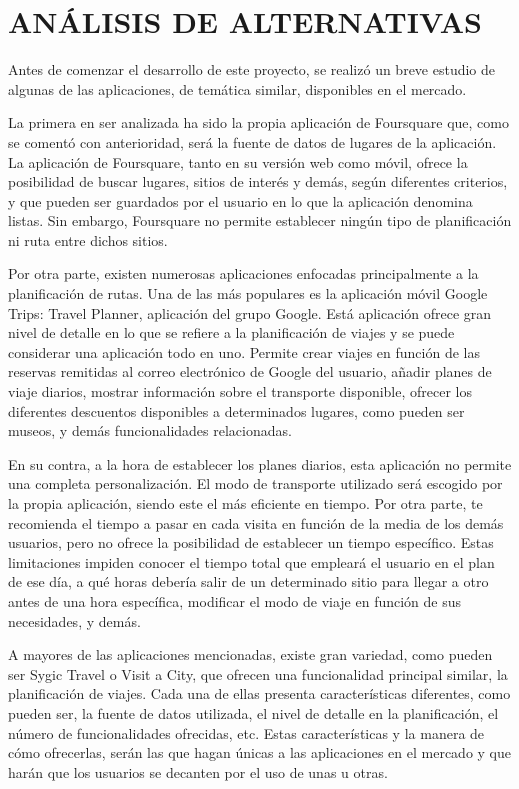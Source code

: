 \chapter[Análisis de alternativas]{
  \label{chp:analisisdealternativas}
  ANÁLISIS DE ALTERNATIVAS
}
\thispagestyle{numberingStyle}
\pagestyle{numberingStyle}



Antes de comenzar el desarrollo de este proyecto, se realizó un breve estudio de algunas de las aplicaciones, de temática similar, disponibles en el mercado. 

La primera en ser analizada ha sido la propia aplicación de Foursquare que, como se comentó con anterioridad, será la fuente de datos de lugares de la aplicación. La aplicación de Foursquare, tanto en su versión web como móvil, ofrece la posibilidad de buscar lugares, sitios de interés y demás, según diferentes criterios, y que pueden ser guardados por el usuario en lo que la aplicación denomina listas. Sin embargo, Foursquare no permite establecer ningún tipo de planificación ni ruta entre dichos sitios.

Por otra parte, existen numerosas aplicaciones enfocadas principalmente a la planificación de rutas. Una de las más populares es la aplicación móvil Google Trips: Travel Planner, aplicación del grupo Google. Está aplicación ofrece gran nivel de detalle en lo que se refiere a la planificación de viajes y se puede considerar una aplicación todo en uno. Permite crear viajes en función de las reservas remitidas al correo electrónico de Google del usuario, añadir planes de viaje diarios, mostrar información sobre el transporte disponible, ofrecer los diferentes descuentos disponibles a determinados lugares, como pueden ser museos, y demás funcionalidades relacionadas.

En su contra, a la hora de establecer los planes diarios, esta aplicación no permite una completa personalización. El modo de transporte utilizado será escogido por la propia aplicación, siendo este el más eficiente en tiempo. Por otra parte, te recomienda el tiempo a pasar en cada visita en función de la media de los demás usuarios, pero no ofrece la posibilidad de establecer un tiempo específico. Estas limitaciones impiden conocer el tiempo total que empleará el usuario en el plan de ese día, a qué horas debería salir de un determinado sitio para llegar a otro antes de una hora específica, modificar el modo de viaje en función de sus necesidades, y demás.


A mayores de las aplicaciones mencionadas, existe gran variedad, como pueden ser Sygic Travel o Visit a City, que ofrecen una funcionalidad principal similar, la planificación de viajes. Cada una de ellas presenta características diferentes, como pueden ser, la fuente de datos utilizada, el nivel de detalle en la planificación, el número de funcionalidades ofrecidas, etc. Estas características y la manera de cómo ofrecerlas, serán las que hagan únicas a las aplicaciones en el mercado y que harán que los usuarios se decanten por el uso de unas u otras.












